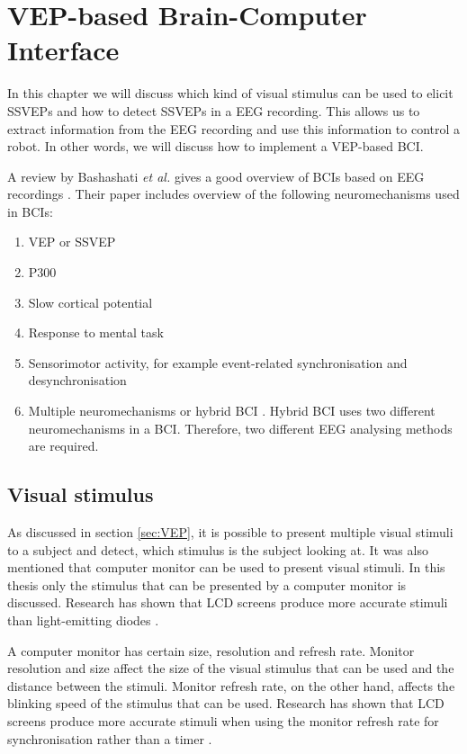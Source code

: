 
\chapter{VEP-based Brain-Computer Interface}

In this chapter we will discuss which kind of visual stimulus can be used to elicit \glspl{SSVEP} and how to detect \glspl{SSVEP} in a \gls{EEG} recording. This allows us to extract information from the \gls{EEG} recording and use this information to control a robot. In other words, we will discuss how to implement a \gls{VEP}-based \gls{BCI}.

A review by Bashashati \emph{et al.} gives a good overview of \glspl{BCI} based on \gls{EEG} recordings \cite{bci_comparison}. Their paper includes overview of the following neuromechanisms used in \glspl{BCI}:
\begin{enumerate}
	\item \gls{VEP} or \gls{SSVEP}
	\item P300
	\item Slow cortical potential
	\item Response to mental task
	\item Sensorimotor activity, for example event-related synchronisation and desynchronisation
	\item Multiple neuromechanisms or hybrid BCI \cite{hybrid_bci, hybrid_bci2}. Hybrid BCI uses two different neuromechanisms in a BCI. Therefore, two different \gls{EEG} analysing methods are required.
\end{enumerate}

\section{Visual stimulus}

As discussed in section \ref{sec:VEP}, it is possible to present multiple visual stimuli to a subject and detect, which stimulus is the subject looking at. It was also mentioned that computer monitor can be used to present visual stimuli. In this thesis only the stimulus that can be presented by a computer monitor is discussed. Research has shown that LCD screens produce more accurate stimuli than light-emitting diodes \cite{lcd_lcd_led}. 

A computer monitor has certain size, resolution and refresh rate. Monitor resolution and size affect the size of the visual stimulus that can be used and the distance between the stimuli. Monitor refresh rate, on the other hand, affects the blinking speed of the stimulus that can be used. Research has shown that LCD screens produce more accurate stimuli when using the monitor refresh rate for synchronisation rather than a timer \cite{lcd_lcd_led}.

